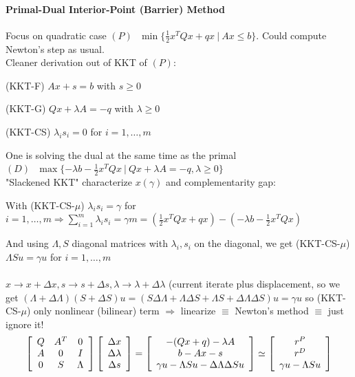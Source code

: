 \documentclass[10pt]{report}
\begin{document}
\paragraph{Primal-Dual Interior-Point (Barrier) Method} Focus on quadratic case $(P)\:\:\:\min\{\frac{1}{2}x^TQx+qx\:|\:Ax\leq b\}$. Could compute Newton's step as usual.\\
Cleaner derivation out of KKT of $(P)$:
\begin{list}{}{}
	\item[(KKT-F)] $Ax + s = b$ with $s\geq 0$
	\item[(KKT-G)] $Qx + \lambda A = -q$ with $\lambda \geq 0$
	\item[(KKT-CS)] $\lambda_i s_i= 0$ for $i=1,\ldots,m$
\end{list}
One is solving the dual at the same time as the primal $(D)\:\:\:\max\{-\lambda b-\frac{1}{2}x^TQx\:|\:Qx+\lambda A= - q, \lambda \geq 0\}$\\
"Slackened KKT" characterize $x(\gamma)$ and complementarity gap:
\begin{list}{}{}
	\item With (KKT-CS-$\mu$) $\lambda_i s_i = \gamma$ for $i=1,\ldots,m \Rightarrow \sum_{i=1}^m\lambda_i s_i = \gamma m = (\frac{1}{2}x^TQx + qx)-(-\lambda b - \frac{1}{2}x^TQx)$
\end{list}
And using $\Lambda, S$ diagonal matrices with $\lambda_i, s_i$ on the diagonal, we get (KKT-CS-$\mu$) $\Lambda Su = \gamma u$ for $i=1,\ldots,m$\\\\
$x\rightarrow x + \Delta x, s\rightarrow s + \Delta s, \lambda \rightarrow \lambda + \Delta\lambda$ (current iterate plus displacement, so we get $(\Lambda + \Delta\Lambda)(S+\Delta S)u = (S\Delta\Lambda + \Lambda\Delta S + \Lambda S + \Delta\Lambda\Delta S)u = \gamma u$ so (KKT-CS-$\mu$) only nonlinear (bilinear) term $\Rightarrow$ linearize $\equiv$ Newton's method $\equiv$ just ignore it!
$$\left[\begin{array}{c c c}
Q&A^T&0\\
A&0&I\\
0&S&\Lambda
\end{array}\right]\left[\begin{array}{c}
\Delta x\\
\Delta \lambda\\
\Delta s
\end{array}\right]=\left[\begin{array}{c}
-(Qx+q)-\lambda A\\
b-Ax-s\\
\gamma u-\Lambda Su - \Delta\Lambda\Delta Su
\end{array}\right] \simeq \left[\begin{array}{c}
r^P\\r^D\\\gamma u-\Lambda Su
\end{array}\right] $$
\end{document}
